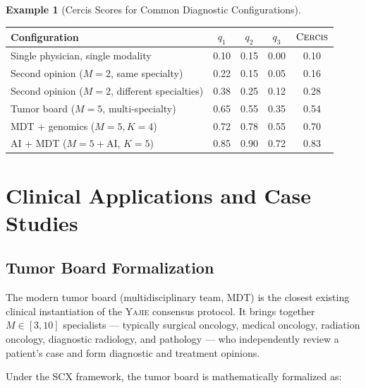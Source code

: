 \documentclass[11pt,a4paper]{article}
\theoremstyle{definition}
\newtheorem{example}[theorem]{Example}
\newcommand{\Yajie}{\textsc{Yajie}}
\newcommand{\Cercis}{\textsc{Cercis}}
\newcommand{\SCX}{\textsc{SCX}}
\begin{document}
\begin{example}[Cercis Scores for Common Diagnostic Configurations]
\label{ex:cercis_scores}
\begin{longtable}{@{}lcccc@{}}
\toprule
\textbf{Configuration} & $q_1$ & $q_2$ & $q_3$ & $\Cercis$ \\
\midrule
Single physician, single modality & 0.10 & 0.15 & 0.00 & 0.10 \\
Second opinion ($M=2$, same specialty) & 0.22 & 0.15 & 0.05 & 0.16 \\
Second opinion ($M=2$, different specialties) & 0.38 & 0.25 & 0.12 & 0.28 \\
Tumor board ($M=5$, multi-specialty) & 0.65 & 0.55 & 0.35 & 0.54 \\
MDT + genomics ($M=5, K=4$) & 0.72 & 0.78 & 0.55 & 0.70 \\
AI + MDT ($M=5 + \text{AI}$, $K=5$) & 0.85 & 0.90 & 0.72 & 0.83 \\
\bottomrule
\end{longtable}
\end{example}

\section{Clinical Applications and Case Studies}
\label{sec:applications}

\subsection{Tumor Board Formalization}

The modern tumor board (multidisciplinary team, MDT) is the closest existing clinical
instantiation of the \Yajie{} consensus protocol. It brings together
$M \in [3, 10]$ specialists --- typically surgical oncology, medical oncology,
radiation oncology, diagnostic radiology, and pathology --- who independently
review a patient's case and form diagnostic and treatment opinions.

Under the \SCX{} framework, the tumor board is mathematically formalized as:
\end{document}
